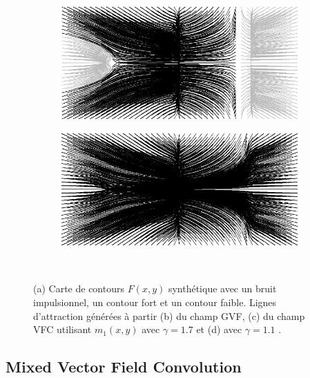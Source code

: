 \begin{figure}[!h]
   \begin{subfigure}[c]{.5\linewidth}
     \centering
     \includegraphics[scale=0.45]{Chapters/Images/synthetic_map_VFC_gamma017.png}
     \caption{}
   \end{subfigure}
   \begin{subfigure}[c]{.5\linewidth}
     \centering
     \includegraphics[scale=0.45]{Chapters/Images/synthetic_map_VFC_gamma011.png}
     \caption{}
   \end{subfigure}\\
   
   \caption{(a) Carte de contours $F(x,y)$ synthétique avec un bruit impulsionnel, un contour fort et un contour faible. Lignes d'attraction générées à partir (b) du champ GVF, (c) du champ VFC utilisant $m_1(x,y)$ avec $\gamma=1.7$ et (d) avec $\gamma = 1.1$ .}
   \label{fig:synthetic_map}
\end{figure}

\subsection{Mixed Vector Field Convolution}





\subsection{}
